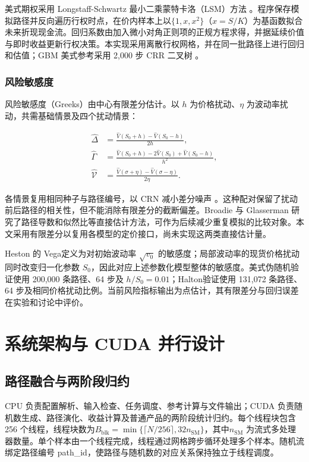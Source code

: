 \documentclass[UTF8,a4paper,zihao=5,fontset=none]{ctexart}
\begin{document}
美式期权采用 Longstaff-Schwartz 最小二乘蒙特卡洛（LSM）方法 \cite{r2}。程序保存模拟路径并反向遍历行权时点，在价内样本上以$\{1,x,x^2\}$（$x=S/K$）为基函数拟合未来折现现金流。回归系数由加入微小对角正则项的正规方程求得，并据延续价值与即时收益更新行权决策。本实现采用离散行权网格，并在同一批路径上进行回归和估值；GBM 美式参考采用 2,000 步 CRR 二叉树 \cite{r6}。


\subsubsection{风险敏感度}

风险敏感度（Greeks）由中心有限差分估计。以 $h$ 为价格扰动、$\eta$ 为波动率扰动，共需基础情景及四个扰动情景：


\nopagebreak[4]
\begin{equation}
\label{eq:10}
\begin{aligned}
\widehat\Delta&=\frac{\widehat V(S_0+h)-\widehat V(S_0-h)}{2h},\\
\widehat\Gamma&=\frac{\widehat V(S_0+h)-2\widehat V(S_0)
+\widehat V(S_0-h)}{h^2},\\
\widehat{\mathcal V}&=\frac{\widehat V(\sigma+\eta)
-\widehat V(\sigma-\eta)}{2\eta}.
\end{aligned}
\end{equation}

各情景复用相同种子与路径编号，以 CRN 减小差分噪声 \cite{r12}。这种配对保留了扰动前后路径的相关性，但不能消除有限差分的截断偏差。Broadie 与 Glasserman \cite{r10} 研究了路径导数和似然比等直接估计方法，可作为后续减少重复模拟的比较对象。本文采用有限差分以复用各模型的定价接口，尚未实现这两类直接估计量。


Heston 的 Vega定义为对初始波动率 $\sqrt{v_0}$ 的敏感度；局部波动率的现货价格扰动同时改变归一化参数 $S_0$，因此对应上述参数化模型整体的敏感度。美式伪随机验证使用 200,000 条路径、64 步及 $h/S_0=0.01$；Halton验证使用 131,072 条路径、64 步及相同价格扰动比例。当前风险指标输出为点估计，其有限差分与回归误差在实验和讨论中评价。


\section{系统架构与 CUDA 并行设计}

\subsection{路径融合与两阶段归约}

CPU 负责配置解析、输入检查、任务调度、参考计算与文件输出；CUDA 负责随机数生成、路径演化、收益计算及普通产品的两阶段统计归约。每个线程块包含256 个线程，线程块数为$B_{\mathrm{blk}}=\min\{\lceil N/256\rceil,32n_{\mathrm{SM}}\}$，其中$n_{\mathrm{SM}}$ 为流式多处理器数量。单个样本由一个线程完成，线程通过网格跨步循环处理多个样本。随机流绑定路径编号 {\small\ttfamily path\_\allowbreak{}id}，使路径与随机数的对应关系保持独立于线程调度。
\end{document}
